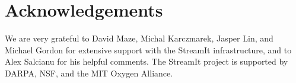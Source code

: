 \documentclass{sig-alternate}
\begin{document}
{%




\section{Acknowledgements}

We are very grateful to David Maze, Michal Karczmarek, Jasper Lin, and
Michael Gordon for extensive support with the StreamIt infrastructure,
and to Alex Salcianu for his helpful comments.  The StreamIt project
is supported by DARPA, NSF, and the MIT Oxygen Alliance.


}
\end{document}
